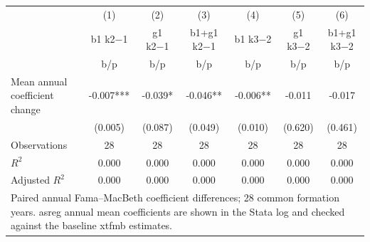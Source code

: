 {
\def\sym#1{\ifmmode^{#1}\else\(^{#1}\)\fi}
\begin{tabular}{l*{6}{c}}
\hline\hline
                    &\multicolumn{1}{c}{(1)}&\multicolumn{1}{c}{(2)}&\multicolumn{1}{c}{(3)}&\multicolumn{1}{c}{(4)}&\multicolumn{1}{c}{(5)}&\multicolumn{1}{c}{(6)}\\
                    &\multicolumn{1}{c}{b1 k2−1}&\multicolumn{1}{c}{g1 k2−1}&\multicolumn{1}{c}{b1+g1 k2−1}&\multicolumn{1}{c}{b1 k3−2}&\multicolumn{1}{c}{g1 k3−2}&\multicolumn{1}{c}{b1+g1 k3−2}\\
                    &         b/p   &         b/p   &         b/p   &         b/p   &         b/p   &         b/p   \\
\hline
Mean annual coefficient change&      -0.007***&      -0.039*  &      -0.046** &      -0.006** &      -0.011   &      -0.017   \\
                    &     (0.005)   &     (0.087)   &     (0.049)   &     (0.010)   &     (0.620)   &     (0.461)   \\
\hline
Observations        &          28   &          28   &          28   &          28   &          28   &          28   \\
\(R^{2}\)           &       0.000   &       0.000   &       0.000   &       0.000   &       0.000   &       0.000   \\
Adjusted \(R^{2}\)  &       0.000   &       0.000   &       0.000   &       0.000   &       0.000   &       0.000   \\
\hline\hline
\multicolumn{7}{l}{\footnotesize Paired annual Fama–MacBeth coefficient differences; 28 common formation years. asreg annual mean coefficients are shown in the Stata log and checked against the baseline xtfmb estimates.}\\
\end{tabular}
}
